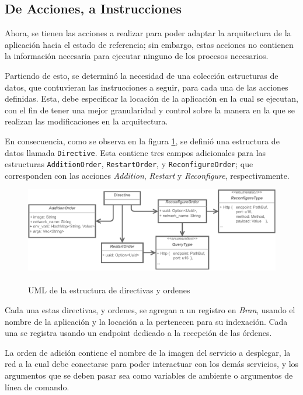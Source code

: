 \subsection{De Acciones, a Instrucciones}

Ahora, se tienen las acciones a realizar para poder adaptar la arquitectura de la aplicación hacia el estado de referencia; sin embargo, estas acciones no contienen la información necesaria para ejecutar ninguno de los procesos necesarios.

Partiendo de esto, se determinó la necesidad de una colección estructuras de datos, que contuvieran las instrucciones a seguir, para cada una de las acciones definidas. Esta, debe especificar la locación de la aplicación en la cual se ejecutan, con el fin de tener una mejor granularidad y control sobre la manera en la que se realizan las modificaciones en la arquitectura.

En consecuencia, como se observa en la figura \ref{fig:Directives}, se definió una estructura de datos llamada \texttt{Directive}. Esta contiene tres campos adicionales para las estructuras \texttt{AdditionOrder}, \texttt{RestartOrder}, y \texttt{ReconfigureOrder}; que corresponden con las acciones \textit{Addition}, \textit{Restart} y \textit{Reconfigure}, respectivamente.

\begin{figure}[ht]
    \centering
    \caption{\\UML de la estructura de directivas y ordenes}
    \label{fig:Directives}
    \includegraphics[width=0.85\linewidth]{images/Directives.pdf}
\end{figure}

Cada una estas directivas, y ordenes, se agregan a un registro en \textit{Bran}, usando el nombre de la aplicación y la locación a la pertenecen para su indexación. Cada una se registra usando un endpoint dedicado a la recepción de las órdenes.

La orden de adición contiene el nombre de la imagen del servicio a desplegar, la red a la cual debe conectarse para poder interactuar con los demás servicios, y los argumentos que se deben pasar sea como variables de ambiente o argumentos de línea de comando. 

